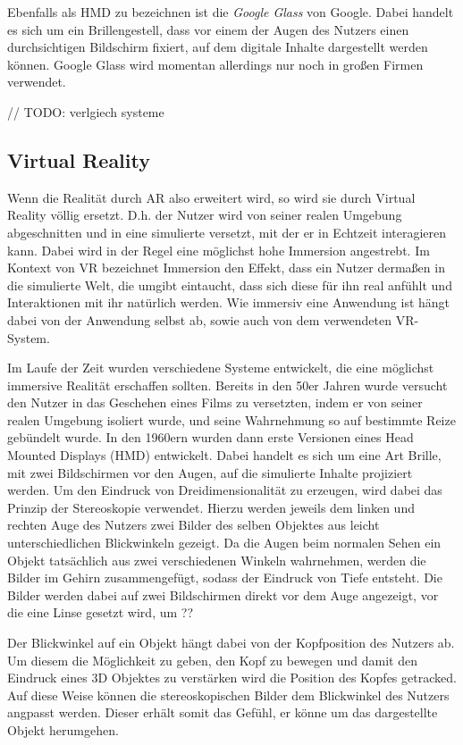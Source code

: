 Ebenfalls als HMD zu bezeichnen ist die \textit{Google Glass} von Google. Dabei handelt es sich um ein Brillengestell, dass vor einem der Augen des Nutzers einen durchsichtigen Bildschirm fixiert, auf dem digitale Inhalte dargestellt werden können. Google Glass wird momentan allerdings nur noch in großen Firmen verwendet.

// TODO:
verlgiech systeme


\subsection{Virtual Reality}

Wenn die Realität durch AR also erweitert wird, so wird sie durch Virtual Reality völlig ersetzt. D.h. der Nutzer wird von seiner realen Umgebung abgeschnitten und in eine simulierte versetzt, mit der er in Echtzeit 
interagieren kann. Dabei wird in der Regel eine möglichst hohe Immersion angestrebt. 
Im Kontext von VR bezeichnet Immersion den Effekt, dass ein Nutzer dermaßen in die simulierte Welt, die umgibt eintaucht, dass sich diese für ihn real anfühlt und Interaktionen mit ihr natürlich werden. Wie immersiv eine Anwendung ist hängt dabei von der Anwendung selbst ab, sowie auch von dem verwendeten VR-System. 

Im Laufe der Zeit wurden verschiedene Systeme entwickelt, die eine möglichst immersive Realität erschaffen sollten. 
Bereits in den 50er Jahren wurde versucht den Nutzer in das Geschehen eines Films zu versetzten, indem er von seiner realen Umgebung isoliert wurde, und seine Wahrnehmung so auf bestimmte Reize gebündelt wurde. %
In den 1960ern wurden dann erste Versionen eines Head Mounted Displays (HMD) entwickelt. %
Dabei handelt es sich um eine Art Brille, mit zwei Bildschirmen vor den Augen, auf die simulierte Inhalte projiziert werden.
Um den Eindruck von Dreidimensionalität zu erzeugen, wird dabei das Prinzip der Stereoskopie verwendet. Hierzu werden jeweils dem linken und rechten Auge des Nutzers zwei Bilder des selben Objektes aus leicht unterschiedlichen Blickwinkeln  gezeigt. Da die Augen beim normalen Sehen ein Objekt tatsächlich aus zwei verschiedenen Winkeln wahrnehmen, werden die Bilder im Gehirn zusammengefügt, sodass der Eindruck von Tiefe entsteht. Die Bilder werden dabei auf zwei Bildschirmen direkt vor dem Auge angezeigt, vor die eine Linse gesetzt wird, um ??

Der Blickwinkel auf ein Objekt hängt dabei von der Kopfposition des Nutzers ab. Um diesem die Möglichkeit zu geben, den Kopf zu bewegen und damit den Eindruck eines 3D Objektes zu verstärken wird die Position des Kopfes getracked. Auf diese Weise können die stereoskopischen Bilder dem Blickwinkel des Nutzers angpasst werden. Dieser erhält somit das Gefühl, er könne um das dargestellte Objekt herumgehen. 

